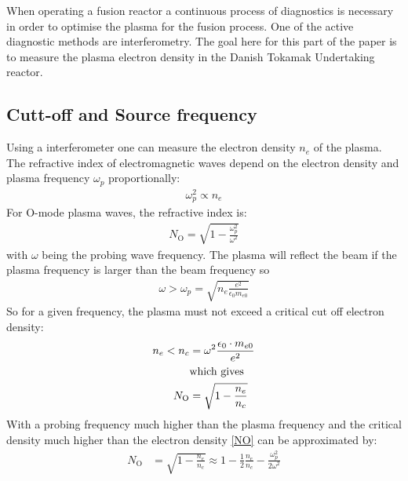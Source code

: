 When operating a fusion reactor a continuous process of diagnostics is necessary in order to optimise the plasma for the fusion process. One of the active diagnostic methods are interferometry.
The goal here for this part of the paper is to measure the plasma electron density in the Danish Tokamak Undertaking reactor.
\subsection{Cutt-off and Source frequency}
Using a interferometer one can measure the electron density \(n_e\) of the plasma. The refractive index of electromagnetic waves depend on the electron density and plasma frequency \(\omega_p\) proportionally:
\begin{align}
	\omega_p^2 \propto n_e
\end{align}
For O-mode plasma waves, the refractive index is:
\begin{align}
	N_{\mathrm{O}} = \sqrt{1-\frac{\omega_p^2}{\omega^2}}
\end{align}
with \(\omega\) being the probing wave frequency.
The plasma will reflect the beam if the plasma frequency is larger than the beam frequency so
\begin{align}
	\omega > \omega_p = \sqrt{n_e\frac{e^2}{\epsilon_0 m_{e0}}}
\end{align}
So for a given frequency, the plasma must not exceed a critical cut off electron density:
\begin{align}
	n_e < n_c      & = \omega^2\frac{\epsilon_0\cdot m_{e0}}{e^2} \label{nenc} \\
	               & \qq*{which gives} \nonumber                               \\
	N_{\mathrm{O}} & = \sqrt{1-\frac{n_e}{n_c}}\label{NO}
\end{align}
With a probing frequency much higher than the plasma frequency and the critical density much higher than the electron density \cref{NO} can be approximated by:
\begin{align}
	N_{\mathrm{O}} & = \sqrt{1-\frac{n_e}{n_c}} \approx 1-\frac{1}{2}\frac{n_e}{n_c} -\frac{\omega_p^2}{2\omega^2}
\end{align}

